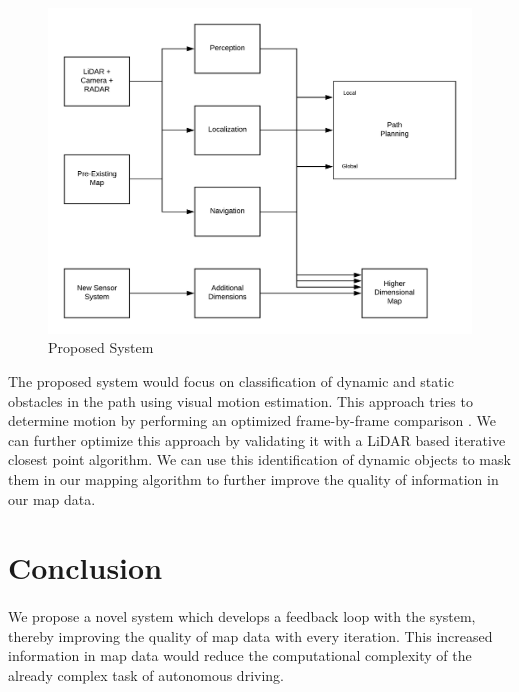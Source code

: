 \documentclass{article}
\begin{document}
			\begin{figure}[H]
			\includegraphics[width=\textwidth]{HERE_Proposed_System}
			\caption{Proposed System}
			\end{figure}
		
		The proposed system would focus on classification of dynamic and static obstacles in the path using visual motion estimation. This approach tries to determine motion by performing an optimized frame-by-frame comparison
		\cite{Krombach_Droeschel_Behnke_2017}.
		We can further optimize this approach by validating it with a LiDAR based iterative closest point algorithm. We can use this identification of dynamic objects
		\cite{kiran_real-time_2018}
		to mask them in our mapping algorithm to further improve the quality of information in our map data.
		
		
	\section{Conclusion}
		\paragraph{}
		We propose a novel system which develops a feedback loop with the system, thereby improving the quality of map data with every iteration. This increased information in map data would reduce the computational complexity of the already complex task of autonomous driving.
	
	
\newpage


\end{document}
